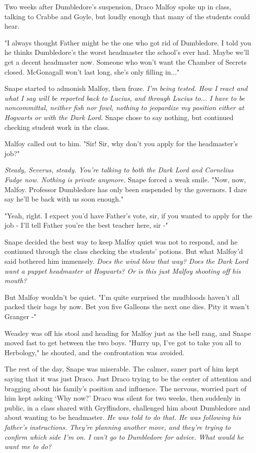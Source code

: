\documentclass[a4paper,11pt]{article}
\begin{document}
Two weeks after Dumbledore's suspension, Draco Malfoy spoke up in class, talking to Crabbe and Goyle, but loudly enough that many of the students could hear.

"I always thought Father might be the one who got rid of Dumbledore. I told you he thinks Dumbledore's the worst headmaster the school's ever had. Maybe we'll get a decent headmaster now. Someone who won't want the Chamber of Secrets closed. McGonagall won't last long, she's only filling in..."

Snape started to admonish Malfoy, then froze. \emph{I'm being tested. How I react and what I say will be reported back to Lucius, and through Lucius to... I have to be noncommittal, neither fish nor fowl, nothing to jeopardize my position either at Hogwarts or with the Dark Lord.} Snape chose to say nothing, but continued checking student work in the class.

Malfoy called out to him. "Sir! Sir, why don't you apply for the headmaster's job?"

\emph{Steady, Severus, steady. You're talking to both the Dark Lord and Cornelius Fudge now. Nothing is private anymore.} Snape forced a weak smile. "Now, now, Malfoy. Professor Dumbledore has only been suspended by the governors. I dare say he'll be back with us soon enough."

"Yeah, right. I expect you'd have Father's vote, sir, if you wanted to apply for the job - I'll tell Father you're the best teacher here, sir -"

Snape decided the best way to keep Malfoy quiet was not to respond, and he continued through the class checking the students' potions. But what Malfoy'd said bothered him immensely. \emph{Does the wind blow that way? Does the Dark Lord want a puppet headmaster at Hogwarts? Or is this just Malfoy shooting off his mouth?}

But Malfoy wouldn't be quiet. "I'm quite surprised the mudbloods haven't all packed their bags by now. Bet you five Galleons the next one dies. Pity it wasn't Granger -"

Weasley was off his stool and heading for Malfoy just as the bell rang, and Snape moved fast to get between the two boys. "Hurry up, I've got to take you all to Herbology," he shouted, and the confrontation was avoided.

The rest of the day, Snape was miserable. The calmer, saner part of him kept saying that it was just Draco. Just Draco trying to be the center of attention and bragging about his family's position and influence. The nervous, worried part of him kept asking `Why now?' Draco was silent for two weeks, then suddenly in public, in a class shared with Gryffindors, challenged him about Dumbledore and about wanting to be headmaster. \emph{He was told to do that. He was following his father's instructions. They're planning another move, and they're trying to confirm which side I'm on. I can't go to Dumbledore for advice. What would he want me to do?}
\end{document}
